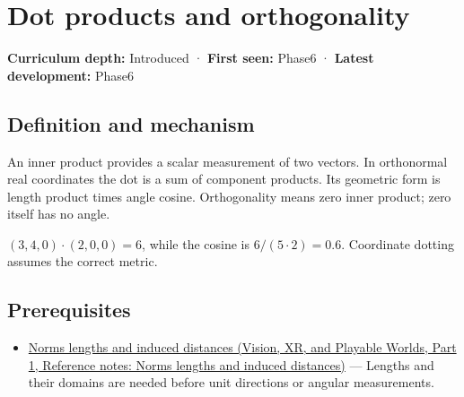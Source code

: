 \hypertarget{appendix-8bc4e8fc547c}{}\label{referencestart:appendix-8bc4e8fc547c}
\section{Dot products and orthogonality}\label{appendix-8bc4e8fc547c-dot-products-and-orthogonality}

\hypertarget{appendix-8bc4e8fc547c-dot-products-and-orthogonality}{}

\textbf{Curriculum depth:} Introduced · \textbf{First seen:} Phase6 · \textbf{Latest development:} Phase6

\begin{allmightroledefinition}

\subsection{Definition and mechanism}\label{appendix-8bc4e8fc547c-definition-and-mechanism}

\hypertarget{appendix-8bc4e8fc547c-definition-and-mechanism}{}

An inner product provides a scalar measurement of two vectors. In orthonormal real coordinates the dot is a sum of component products. Its geometric form is length product times angle cosine. Orthogonality means zero inner product; zero itself has no angle.

\end{allmightroledefinition}

\((3,4,0)\cdot(2,0,0)=6\), while the cosine is \(6/(5\cdot2)=0.6\). Coordinate dotting assumes the correct metric.

\subsection{Prerequisites}\label{appendix-8bc4e8fc547c-prerequisites}

\hypertarget{appendix-8bc4e8fc547c-prerequisites}{}

\begin{itemize}
\tightlist
\item
  \href{../07-Vision-XR-and-Playable-Worlds-P01/main.pdf\#nameddest=appendix-49933872bb51}{Norms lengths and induced distances (Vision, XR, and Playable Worlds, Part 1, Reference notes: Norms lengths and induced distances)} --- Lengths and their domains are needed before unit directions or angular measurements.
\end{itemize}

